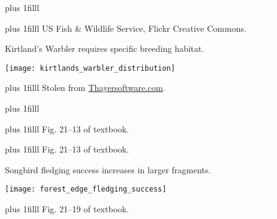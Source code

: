 \documentclass[t]{beamer}
\newcommand\imagecredit[1]{%
	\vskip0pt plus 1filll \tiny #1}%
\begin{document}

{
\begin{frame}[t,plain]{}
\imagecredit{\textcolor{white}{Wikimedia Commons, Cornell University.}}
\end{frame}
}

{
\begin{frame}[t,plain]{}
\imagecredit{US Fish \& Wildlife Service, Flickr Creative Commons.}
\end{frame}
}

\begin{frame}[t,plain]{Kirtland's Warbler requires specific breeding habitat.}
	\begin{center}
		\texttt{[image: kirtlands\_warbler\_distribution]}
	\end{center}	

	\imagecredit{\hfill Stolen from \url{Thayersoftware.com}.}
\end{frame}

{
\begin{frame}[t,plain]{}
	\imagecredit{\hfill\textcolor{white}{Gail Diane Yovanovich, National Wildlife Refuge Association.}}
\end{frame}
}


{
\begin{frame}[t,plain]{}
	\imagecredit{Fig. 21–13 of textbook.}
\end{frame}
}

{
\begin{frame}[t,plain]{}
	\imagecredit{Fig. 21–13 of textbook.}
\end{frame}
}


\begin{frame}[t,plain]{Songbird fledging success increases in larger fragments.}
	\begin{center}
		\texttt{[image: forest\_edge\_fledging\_success]}
	\end{center}	

	\imagecredit{\hfill Fig. 21–19 of textbook.}
\end{frame}
\end{document}
